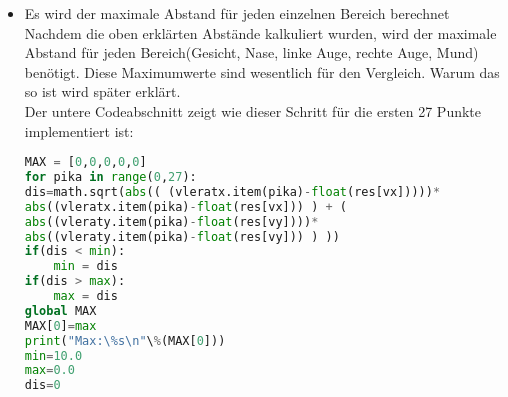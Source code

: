 \begin{enumerate}
\begin{itemize}
	
	\begin{figure}[H]
		\centering
		\texttt{[image: \\ordnerfigures Vergleichsweg.png]}
		\caption{Vergleichsmethode zweier Punkte}
		\label{fig:Vergleichsweg}
	\end{figure}
	
	Auf Abbildung \ref{fig:Vergleichsweg} wird die verwendete Vergleichsmethode dargestellt. Der Startpunkt hat die Koordinaten (0/0) und befindet sich links oben. Jeder Punkt hat seine bestimmten Koordinaten, zum Beispiel, der Punkt 36 des ersten Bildes hat die Koordinaten x1 und y1, und den 36.Punkt des anderen Bildes hat die Koordinaten x2 und y2. Um den Abstand des Punkt 36 zu berechnen, wird die pythagoreische Formel verwendet. Die Differenz der x-Koordinaten und die Differenz der beiden y-Koordinaten sind die beide Katheten(a und b auf der Abbildung). Um die Hypotenuse zu finden wird das Quadrat beider Katheten addiert, und am Ende wird die Wurzel des Ergebnisses berechnet. Das Ergebnis ist der Abstand des Punktes 36 vom Startpunkt. Dieselbe Methode wird für jeder Punkt verwendet.
	Das obige Beispiel vergleicht die Abstände der Punkte von 2 verschiedenen Bildern. Das Vergleichsprinzip ist dasselbe wie bei dem Vergleich der Punkteabstände des gemachten Bildes und der in der Datenbank gespeicherten Punkteabstände. Es ist einfach leichter erklärbar und verstehbar, wenn 2 Bildern vergleicht wurden. 
	Die Abstände aller Punkt aller Bereiche wurde in einer Variable gespeichert.\\
	
	\item Es wird der maximale Abstand für jeden einzelnen Bereich berechnet \\
	
	Nachdem die oben erklärten Abstände kalkuliert wurden, wird der maximale Abstand für jeden Bereich(Gesicht, Nase, linke Auge, rechte Auge, Mund) benötigt. Diese Maximumwerte sind wesentlich für den Vergleich. Warum das so ist wird später erklärt. \\
	Der untere Codeabschnitt zeigt wie dieser Schritt für die ersten 27 Punkte implementiert ist: \\
	
\begin{lstlisting}[language=Python]
MAX = [0,0,0,0,0]
for pika in range(0,27):
dis=math.sqrt(abs(( (vleratx.item(pika)-float(res[vx]))))* 
abs((vleratx.item(pika)-float(res[vx])) ) + ( 
abs((vleraty.item(pika)-float(res[vy])))* 
abs((vleraty.item(pika)-float(res[vy])) ) ))
if(dis < min):
	min = dis
if(dis > max):
	max = dis    
global MAX
MAX[0]=max
print("Max:\%s\n"\%(MAX[0]))
min=10.0
max=0.0
dis=0
\end{lstlisting}
	

\end{itemize}
\end{enumerate}
